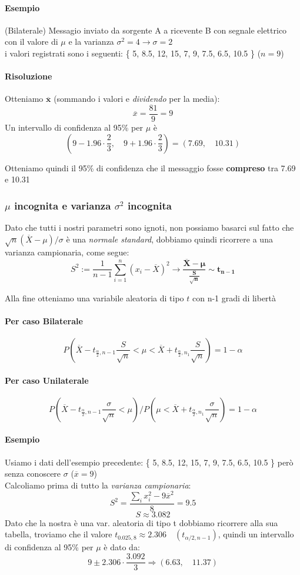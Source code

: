 \documentclass[]{article}
\begin{document}
    \paragraph{Esempio} (Bilaterale) Messagio inviato da sorgente A a ricevente B con segnale elettrico con il valore di $\mu$ e la varianza $\sigma^2 = 4 \rightarrow \sigma = 2$ \\
    i valori registrati sono i seguenti: \{ 5, 8.5, 12, 15, 7, 9, 7.5, 6.5, 10.5 \} ($n = 9$)
    \paragraph{Risoluzione} Otteniamo $\boldsymbol{\overline{x}}$ (sommando i valori e \textit{dividendo} per la media):
    \[ \overline{x} = \frac{81}{9} = 9 \]
    Un intervallo di confidenza al 95\% per $\mu$ è
    \[ \left( 9 - 1.96 \cdot \frac{2}{3}, \quad 9 + 1.96 \cdot \frac{2}{3}\right) = (7.69, \quad 10.31) \]
    \centerline{Otteniamo quindi il 95\% di confidenza che il messaggio fosse \textbf{compreso} tra 7.69 e 10.31}
    \subsubsection{$\mu$ incognita e varianza  $\sigma^2$ incognita}
    Dato che tutti i nostri parametri sono ignoti, non possiamo basarci sul fatto che $\sqrt{n}(\overline{X} - \mu) / \sigma$ è una \textit{normale standard}, dobbiamo quindi ricorrere a una varianza campionaria, come segue:
    \[ S^2 := \frac{1}{n-1} \sum_{i=1}^{n} (x_i - \overline{X})^2 \longrightarrow \boldsymbol{\frac{\overline{X} - \mu}{\frac{S}{\sqrt{n}}} \sim t_{n-1}}\]
    \centerline{Alla fine otteniamo una variabile aleatoria di tipo $t$ con n-1 gradi di libertà}
    \paragraph{Per caso Bilaterale}
    \[ P \left( \overline{X} - t_{\frac{\alpha}{2}, n-1} \frac{S}{\sqrt{n}} < \mu < \overline{X} + t_{\frac{\alpha}{2}, n_1} \frac{S}{\sqrt{n}} \right) = 1 - \alpha \]
    \paragraph{Per caso Unilaterale}
    \[ P \left( \overline{X} - t_{\frac{\alpha}{2}, n-1} \frac{\sigma}{\sqrt{n}} < \mu \right) /  P \left( \mu < \overline{X} + t_{\frac{\alpha}{2}, n_1} \frac{\sigma}{\sqrt{n}}\right) = 1 - \alpha \]
    \paragraph{Esempio} Usiamo i dati dell'esempio precedente: \{ 5, 8.5, 12, 15, 7, 9, 7.5, 6.5, 10.5 \} però senza conoscere $\sigma$ ($\overline{x} = 9$)\\
    Calcoliamo prima di tutto la \textit{varianza campionaria}:
    \[ S^2 = \frac{\sum_{i}^{} x^2_i - 9\overline{x}^2}{8} = \boldsymbol{9.5} \]
    \[ S \approx 3.082 \]
    Dato che la nostra è una var. aleatoria di tipo t dobbiamo ricorrere alla sua tabella, troviamo che il valore $t_{0.025,8} \approx 2.306 \quad (t_{\alpha/2, n-1})$, quindi un intervallo di confidenza al 95\% per $\mu$ è dato da:
    \[ 9 \pm 2.306 \cdot \frac{3.092}{3} \Longrightarrow (6.63, \quad 11.37) \]
\end{document}
